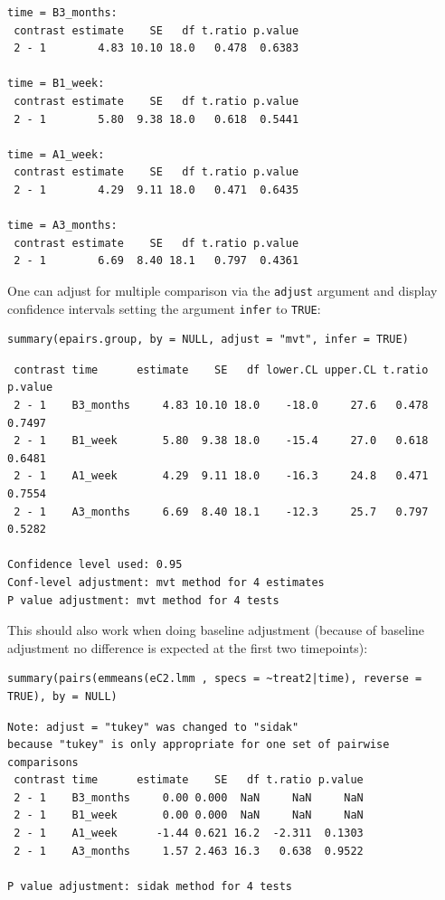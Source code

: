 \documentclass[12pt]{article}
\begin{document}
\begin{verbatim}
time = B3_months:
 contrast estimate    SE   df t.ratio p.value
 2 - 1        4.83 10.10 18.0   0.478  0.6383

time = B1_week:
 contrast estimate    SE   df t.ratio p.value
 2 - 1        5.80  9.38 18.0   0.618  0.5441

time = A1_week:
 contrast estimate    SE   df t.ratio p.value
 2 - 1        4.29  9.11 18.0   0.471  0.6435

time = A3_months:
 contrast estimate    SE   df t.ratio p.value
 2 - 1        6.69  8.40 18.1   0.797  0.4361
\end{verbatim}

One can adjust for multiple comparison via the \texttt{adjust} argument and
display confidence intervals setting the argument \texttt{infer} to \texttt{TRUE}:
\lstset{language=r,label= ,caption= ,captionpos=b,numbers=none}
\begin{lstlisting}
summary(epairs.group, by = NULL, adjust = "mvt", infer = TRUE)
\end{lstlisting}

\begin{verbatim}
 contrast time      estimate    SE   df lower.CL upper.CL t.ratio p.value
 2 - 1    B3_months     4.83 10.10 18.0    -18.0     27.6   0.478  0.7497
 2 - 1    B1_week       5.80  9.38 18.0    -15.4     27.0   0.618  0.6481
 2 - 1    A1_week       4.29  9.11 18.0    -16.3     24.8   0.471  0.7554
 2 - 1    A3_months     6.69  8.40 18.1    -12.3     25.7   0.797  0.5282

Confidence level used: 0.95 
Conf-level adjustment: mvt method for 4 estimates 
P value adjustment: mvt method for 4 tests
\end{verbatim}


This should also work when doing baseline adjustment (because of
baseline adjustment no difference is expected at the first two
timepoints):
\lstset{language=r,label= ,caption= ,captionpos=b,numbers=none}
\begin{lstlisting}
summary(pairs(emmeans(eC2.lmm , specs = ~treat2|time), reverse = TRUE), by = NULL)
\end{lstlisting}

\begin{verbatim}
Note: adjust = "tukey" was changed to "sidak"
because "tukey" is only appropriate for one set of pairwise comparisons
 contrast time      estimate    SE   df t.ratio p.value
 2 - 1    B3_months     0.00 0.000  NaN     NaN     NaN
 2 - 1    B1_week       0.00 0.000  NaN     NaN     NaN
 2 - 1    A1_week      -1.44 0.621 16.2  -2.311  0.1303
 2 - 1    A3_months     1.57 2.463 16.3   0.638  0.9522

P value adjustment: sidak method for 4 tests
\end{verbatim}
\end{document}
